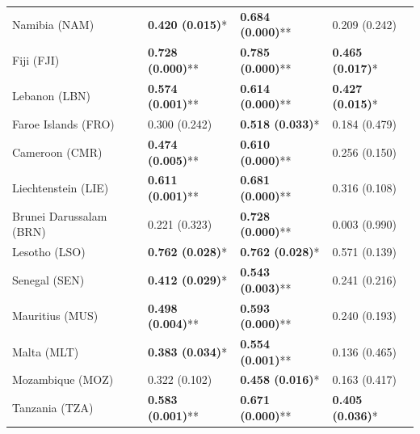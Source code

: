 \begin{longtable}{p{5cm}p{3cm}p{3cm}p{5cm}}
Namibia (NAM) & \textcolor{atlLime600}{\textbf{0.420 (0.015)}*} & \textcolor{atlLime600}{\textbf{0.684 (0.000)}**} & \textcolor{atlOrange600}{0.209 (0.242)} \\
Fiji (FJI) & \textcolor{atlLime600}{\textbf{0.728 (0.000)}**} & \textcolor{atlLime600}{\textbf{0.785 (0.000)}**} & \textcolor{atlLime600}{\textbf{0.465 (0.017)}*} \\
Lebanon (LBN) & \textcolor{atlLime600}{\textbf{0.574 (0.001)}**} & \textcolor{atlLime600}{\textbf{0.614 (0.000)}**} & \textcolor{atlLime600}{\textbf{0.427 (0.015)}*} \\
Faroe Islands (FRO) & \textcolor{atlOrange600}{0.300 (0.242)} & \textcolor{atlLime600}{\textbf{0.518 (0.033)}*} & \textcolor{atlOrange600}{0.184 (0.479)} \\
Cameroon (CMR) & \textcolor{atlLime600}{\textbf{0.474 (0.005)}**} & \textcolor{atlLime600}{\textbf{0.610 (0.000)}**} & \textcolor{atlOrange600}{0.256 (0.150)} \\
Liechtenstein (LIE) & \textcolor{atlLime600}{\textbf{0.611 (0.001)}**} & \textcolor{atlLime600}{\textbf{0.681 (0.000)}**} & \textcolor{atlOrange600}{0.316 (0.108)} \\
Brunei Darussalam (BRN) & \textcolor{atlOrange600}{0.221 (0.323)} & \textcolor{atlLime600}{\textbf{0.728 (0.000)}**} & \textcolor{atlOrange600}{0.003 (0.990)} \\
Lesotho (LSO) & \textcolor{atlLime600}{\textbf{0.762 (0.028)}*} & \textcolor{atlLime600}{\textbf{0.762 (0.028)}*} & \textcolor{atlOrange600}{0.571 (0.139)} \\
Senegal (SEN) & \textcolor{atlLime600}{\textbf{0.412 (0.029)}*} & \textcolor{atlLime600}{\textbf{0.543 (0.003)}**} & \textcolor{atlOrange600}{0.241 (0.216)} \\
Mauritius (MUS) & \textcolor{atlLime600}{\textbf{0.498 (0.004)}**} & \textcolor{atlLime600}{\textbf{0.593 (0.000)}**} & \textcolor{atlOrange600}{0.240 (0.193)} \\
Malta (MLT) & \textcolor{atlLime600}{\textbf{0.383 (0.034)}*} & \textcolor{atlLime600}{\textbf{0.554 (0.001)}**} & \textcolor{atlOrange600}{0.136 (0.465)} \\
Mozambique (MOZ) & \textcolor{atlOrange600}{0.322 (0.102)} & \textcolor{atlLime600}{\textbf{0.458 (0.016)}*} & \textcolor{atlOrange600}{0.163 (0.417)} \\
Tanzania (TZA) & \textcolor{atlLime600}{\textbf{0.583 (0.001)}**} & \textcolor{atlLime600}{\textbf{0.671 (0.000)}**} & \textcolor{atlLime600}{\textbf{0.405 (0.036)}*} \\

\end{longtable}
